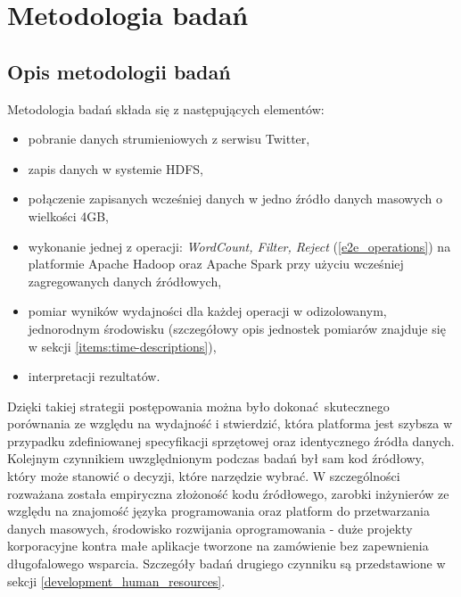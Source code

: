 \chapter{Metodologia badań} \label{chap.technology-stack}
\section{Opis metodologii badań}
Metodologia badań składa się z następujących elementów:
\begin{itemize}
	\item pobranie danych strumieniowych z serwisu Twitter,
	\item zapis danych w systemie HDFS,
	\item połączenie zapisanych wcześniej danych w jedno źródło danych masowych o wielkości 4GB,
	\item wykonanie jednej z operacji: \textit{WordCount, Filter, Reject} (\ref{e2e_operations}) na platformie Apache Hadoop oraz Apache Spark przy użyciu wcześniej zagregowanych danych źródłowych,
	\item pomiar wyników wydajności dla każdej operacji w odizolowanym, jednorodnym środowisku (szczegółowy opis jednostek pomiarów znajduje się w sekcji \ref{items:time-descriptions}),
	\item interpretacji rezultatów.
\end{itemize}
Dzięki takiej strategii postępowania można było dokonać skutecznego porównania ze względu na wydajność i stwierdzić, która platforma jest szybsza w przypadku zdefiniowanej specyfikacji sprzętowej oraz identycznego źródła danych. Kolejnym czynnikiem uwzględnionym podczas badań był sam kod źródłowy, który może stanowić o decyzji, które narzędzie wybrać. W szczególności rozważana została empiryczna złożoność kodu źródłowego, zarobki inżynierów ze względu na znajomość języka programowania oraz platform do przetwarzania danych masowych, środowisko rozwijania oprogramowania - duże projekty korporacyjne kontra małe aplikacje tworzone na zamówienie bez zapewnienia długofalowego wsparcia. Szczegóły badań drugiego czynniku są przedstawione w sekcji \ref{development_human_resources}.  
